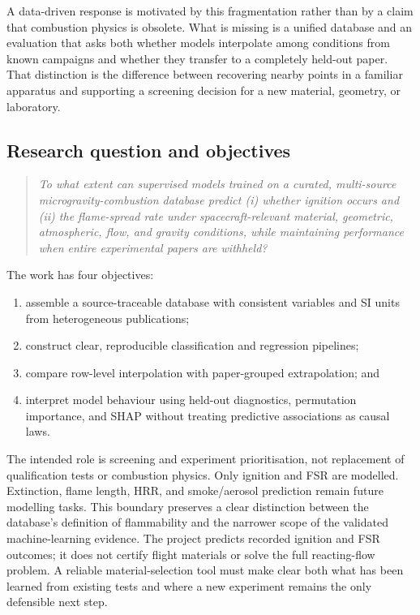 A data-driven response is motivated by this fragmentation rather than by a claim that combustion physics is obsolete. What is missing is a unified database and an evaluation that asks both whether models interpolate among conditions from known campaigns and whether they transfer to a completely held-out paper. That distinction is the difference between recovering nearby points in a familiar apparatus and supporting a screening decision for a new material, geometry, or laboratory.

\subsection{Research question and objectives}

\begin{quote}
\emph{To what extent can supervised models trained on a curated, multi-source
microgravity-combustion database predict (i) whether ignition occurs and (ii)
the flame-spread rate under spacecraft-relevant material, geometric,
atmospheric, flow, and gravity conditions, while maintaining performance when
entire experimental papers are withheld?}
\end{quote}

The work has four objectives:
\begin{enumerate}
  \item assemble a source-traceable database with consistent variables and SI
  units from heterogeneous publications;
  \item construct clear, reproducible classification and regression pipelines;
  \item compare row-level interpolation with paper-grouped extrapolation; and
  \item interpret model behaviour using held-out diagnostics, permutation
  importance, and SHAP without treating predictive associations as causal laws.
\end{enumerate}

The intended role is screening and experiment prioritisation, not replacement of qualification tests or combustion physics. Only ignition and FSR are modelled. Extinction, flame length, HRR, and smoke/aerosol prediction remain future modelling tasks. This boundary preserves a clear distinction between the database's definition of flammability and the narrower scope of the validated machine-learning evidence. The project predicts recorded ignition and FSR outcomes; it does not certify flight materials or solve the full reacting-flow problem. A reliable material-selection tool must make clear both what has been learned from existing tests and where a new experiment remains the only defensible next step.
